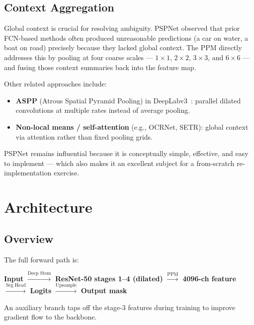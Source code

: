 \documentclass[12pt,a4paper]{article}
\begin{document}
\subsection{Context Aggregation}

Global context is crucial for resolving ambiguity.  PSPNet observed that
prior FCN-based methods often produced unreasonable predictions (a car on
water, a boat on road) precisely because they lacked global context.  The PPM
directly addresses this by pooling at four coarse scales — $1\times1$,
$2\times2$, $3\times3$, and $6\times6$ — and fusing those context summaries
back into the feature map.

Other related approaches include:
\begin{itemize}[noitemsep]
    \item \textbf{ASPP} (Atrous Spatial Pyramid Pooling) in DeepLabv3~\cite{chen2017}: parallel
          dilated convolutions at multiple rates instead of average pooling.
    \item \textbf{Non-local means / self-attention} (e.g., OCRNet, SETR): global
          context via attention rather than fixed pooling grids.
\end{itemize}

PSPNet remains influential because it is conceptually simple, effective, and
easy to implement — which also makes it an excellent subject for a
from-scratch re-implementation exercise.

\section{Architecture}

\subsection{Overview}

The full forward path is:

\begin{center}
\textbf{Input} $\xrightarrow{\text{Deep Stem}}$
\textbf{ResNet-50 stages 1--4 (dilated)}
$\xrightarrow{\text{PPM}}$
\textbf{4096-ch feature}
$\xrightarrow{\text{Seg Head}}$
\textbf{Logits}
$\xrightarrow{\text{Upsample}}$
\textbf{Output mask}
\end{center}

An auxiliary branch taps off the stage-3 features during training to
improve gradient flow to the backbone.
\end{document}
